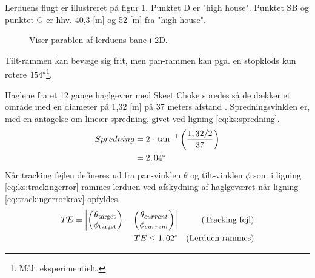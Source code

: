 Lerduens flugt er illustreret på figur \ref{fig:para_total}.
Punktet D er "high house".
Punktet SB og punktet G er hhv. 40,3 [m] og 52 [m] fra "high house". \\
\begin{figure}[h!]
\centering
{}
\caption[Lerduens parabel i 2D]{Viser parablen af lerduens bane i 2D.}
\label{fig:para_total}
\end{figure}

Tilt-rammen kan bevæge sig frit,
men pan-rammen kan pga. en stopklods kun rotere \(154 \degree\)\footnote{Målt eksperimentielt.}.

Haglene fra et 12 gauge haglgevær med Skeet Choke spredes så de dækker et område
med en diameter på 1,32 [m] på 37 meters afstand
\citep[Pattern and choke]{patternandchoke}.
Spredningsvinklen er, med en antagelse om lineær spredning, givet ved ligning \ref{eq:ks:spredning}.
\begin{align}
\begin{split}
  Spredning &= 2\cdot{}\tan^{-1}\left(\frac{1,32/2}{37}\right) \\
  &= 2,04 \degree
  \end{split}
  \label{eq:ks:spredning}
\end{align}
Når tracking fejlen defineres ud fra pan-vinklen \(\theta\) og tilt-vinklen \(\phi\) som i ligning \ref{eq:ks:trackingerror} rammes 
lerduen ved afskydning af haglgeværet når ligning \ref{eq:trackingerrorkrav} opfyldes.
\begin{align}
  TE = \left | \begin{pmatrix}  \theta_{\text{target}}\\ \phi_{\text{target}}\end{pmatrix} - \begin{pmatrix} \theta_{current}\\ 
  \phi_{current}\end{pmatrix} \right | &&\text{(Tracking fejl)}
\label{eq:ks:trackingerror}
\\
	TE\leq 1,02 \degree && \text{(Lerduen rammes)}
\label{eq:trackingerrorkrav}
\end{align}

